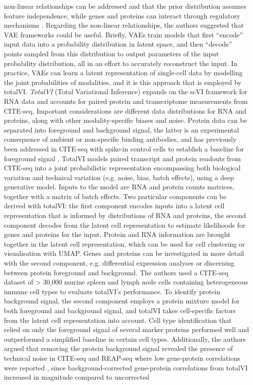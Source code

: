 \documentclass[times, twoside, watermark]{zHenriquesLab-StyleBioRxiv}
\begin{document}
non-linear relationships can be addressed and that the prior distribution assumes feature independence, while genes and proteins can interact through regulatory mechanisms \cite{Argelaguet2020}. Regarding the non-linear relationships, the authors suggested that VAE frameworks could be useful. Briefly, VAEs train models that first “encode” input data into a probability distribution in latent space, and then “decode” points sampled from this distribution to output parameters of the input probability distribution, all in an effort to accurately reconstruct the input. In practice, VAEs can learn a latent representation of single-cell data by modelling the joint probabilities of modalities, and it is this approach that is employed by totalVI. \newline \textit{TotalVI} (Total Variational Inference) \cite{Gayoso2021} expands on the scVI framework for RNA data \cite{Lopez2018} and accounts for paired protein and transcriptome measurements from CITE-seq. Important considerations are different data distributions for RNA and proteins, along with other modality-specific biases and noise. Protein data can be separated into foreground and background signal, the latter is an experimental consequence of ambient or non-specific binding antibodies, and has previously been addressed in CITE-seq with spike-in control cells to establish a baseline for foreground signal \cite{Stoeckius2017}. TotalVI models paired transcript and protein readouts from CITE-seq into a joint probabilistic representation encompassing both biological variation and technical variation (e.g. noise, bias, batch effects), using a deep generative model. Inputs to the model are RNA and protein counts matrices, together with a matrix of batch effects. Two particular components can be derived with totalVI: the first component encodes inputs into a latent cell representation that is informed by distributions of RNA and proteins, the second component decodes from the latent cell representation to estimate likelihoods for genes and proteins for the input. Protein and RNA information are brought together in the latent cell representation, which can be used for cell clustering or visualisation with UMAP. Genes and proteins can be investigated in more detail with the second component, e.g. differential expression analyses or discerning between protein foreground and background. The authors used a CITE-seq dataset of > 30,000 murine spleen and lymph node cells containing heterogeneous immune cell types to evaluate totalVI’s performance. To identify protein background signal, the second component employs a protein mixture model for both foreground and background signal, and totalVI takes cell-specific factors from the latent cell representation into account. Cell type identification that relied on only the foreground signal of several marker proteins performed well and outperformed a simplified baseline in certain cell types. Additionally, the authors argued that removing the protein background signal revealed the presence of technical noise in CITE-seq and REAP-seq where low gene-protein correlations were reported \cite{Stoeckius2017,Peterson2017}, since background-corrected gene-protein correlations from totalVI increased in magnitude compared to uncorrected 
\end{document}
